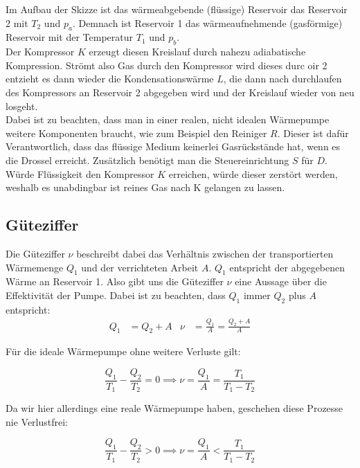 Im Aufbau der Skizze ist das wärmeabgebende (flüssige) Reservoir das Reservoir 2 mit $T_{2}$ und $p_{a}$. Demnach ist Reservoir 1 das wärmeaufnehmende
(gasförmige) Reservoir mit der Temperatur $T_{1}$ und $p_{b}$. \\

Der Kompressor $K$ erzeugt diesen Kreislauf durch nahezu adiabatische Kompression. Strömt also Gas durch den 
Kompressor wird dieses durc oir 2 entzieht es dann wieder die Kondensationswärme $L$, die dann nach durchlaufen des Kompressors an Reservoir 2 abgegeben
wird und der Kreislauf wieder von neu losgeht. \\

Dabei ist zu beachten, dass man in einer realen, nicht idealen Wärmepumpe weitere Komponenten braucht, wie zum Beispiel den Reiniger $R$.
Dieser ist dafür Verantwortlich, dass das flüssige Medium keinerlei Gasrückstände hat, wenn es die Drossel erreicht.
Zusätzlich benötigt man die Steuereinrichtung $S$ für $D$. Würde Flüssigkeit den Kompressor $K$ erreichen, würde dieser zerstört werden,
weshalb es unabdingbar ist reines Gas nach K gelangen zu lassen.

\subsection{Güteziffer} \label{sec:Güteziffer}

Die Güteziffer $\nu$ beschreibt dabei das Verhältnis zwischen der transportierten Wärmemenge $Q_{1}$ und der verrichteten Arbeit $A$.
$Q_{1}$ entspricht der abgegebenen Wärme an Reservoir 1. Also gibt uns die Güteziffer $\nu$ eine Aussage über die Effektivität der Pumpe.
Dabei ist zu beachten, dass $Q_{1}$ immer $Q_{2}$ plus $A$ entspricht:
\begin{align} \label{eq:Güteziffer}
    Q_{1} &= Q_{2} + A & \nu &= \frac{Q_{1}}{A} = \frac{Q_{2} + A}{A}
\end{align}

Für die ideale Wärmepumpe ohne weitere Verluste gilt:

\begin{equation}
    \frac{Q_{1}}{T_{1}} - \frac{Q_{2}}{T_{2}} = 0 \implies \nu = \frac{Q_{1}}{A} = \frac{T_{1}}{T_{1} - T_{2}}
\end{equation}

Da wir hier allerdings eine reale Wärmepumpe haben, geschehen diese Prozesse nie Verlustfrei:

\begin{equation}
    \frac{Q_{1}}{T_{1}} - \frac{Q_{2}}{T_{2}} > 0 \implies \nu = \frac{Q_{1}}{A} < \frac{T_{1}}{T_{1} - T_{2}}
\end{equation}

